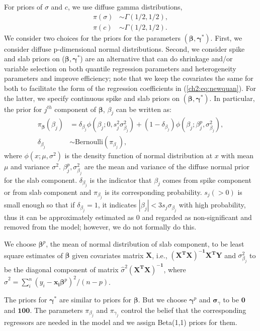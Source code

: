 \documentclass[12pt]{article}
\begin{document}
For priors of $\sigma$ and $c$, we use diffuse gamma distributions,
\begin{align*}
  \pi(\sigma) & \sim \Gamma (1/2, 1/2), \\
  \pi(c) & \sim \Gamma(1/2, 1/2).
\end{align*}
We consider two choices for the priors for the parameters
$(\bm{\beta}, \bm{\gamma}^{*})$.  First, we consider diffuse p-dimensional
normal distributions.  Second, we consider spike and slab priors on
($\bm \beta, \bm \gamma^{*}$) are an alternative that can do shrinkage
and/or variable selection on both quantile regression parameters and
heterogeneity parameters and improve efficiency; note that we keep the
covariates the same for both to facilitate the form of the regression
coefficients in (\ref{ch2:eq:newquan}).  For the latter, we specify
continuous spike and slab priors \citep{george1993}
on $(\bm \beta, \bm \gamma^{*})$.
In particular, the prior for $j^{th}$ component of $\bm \beta$, $\beta_j$ can be written as:
\begin{align*}
  \pi_{\bm \beta} (\beta_j) &= \delta_{\beta_j} \phi(\beta_j; 0, s_j^2
  \sigma_{\beta_j}^2) +
  (1- \delta_{\beta_j}) \phi(\beta_j; \beta_j^p, \sigma_{\beta_j}^2),\\
  \delta_{\beta_j} & \sim \mbox{Bernoulli} (\pi_{\beta_j}),
\end{align*}
where $\phi(x; \mu, \sigma^2)$ is the density function of normal
distribution at $x$ with mean $\mu$ and variance
$\sigma^2$. $\beta_j^p, \sigma_{\beta_j}^2$ are the mean and variance
of the diffuse normal prior for the slab component.
$\delta_{\beta_j}$ is the indicator that $\beta_j$ comes from spike
component or from slab component and $\pi_{\beta_j}$ is its corresponding
probability.  $s_j (>0)$ is small enough so that if $\delta_{\beta_j}
= 1$, it indicates $|\beta_j | < 3 s_j\sigma_{\beta_j}$ with high
probability, thus it can be approximately estimated as 0 and regarded
as non-significant and removed from the model; however, we do not formally do this.

We choose $\bm \beta^p$, the mean of normal distribution of slab
component, to be least square estimates of $\bm \beta$ given covariates
matrix $\bm X$, i.e., $\bm{(X^TX)^{-1}X^TY}$ and
$\sigma_{\beta_j}^2$ to be the diagonal component of matrix
$\hat{\sigma}^2 \bm{(X^TX)^{-1}}$, where $\hat{\sigma}^2 = \sum_i^n
(y_i - \bm{x_i\beta}^p)^2/(n - p)$.

The priors for $\bm \gamma^{*}$ are similar to priors for $\bm \beta$. But
we choose $\bm \gamma^p$ and $\bm \sigma_{\gamma}$ to be $\bm 0$ and
$\bm{100}$.
The parameters $\pi_{\beta_j}$ and $\pi_{\gamma_j}$ control the belief that the
corresponding regressors are needed in the model and
we assign Beta(1,1) priors for them.
\end{document}
